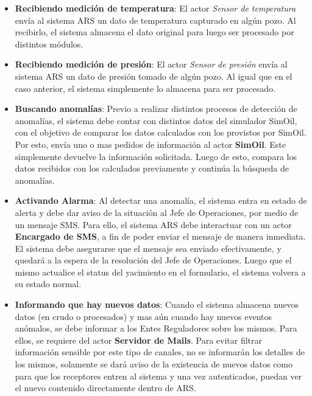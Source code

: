 \begin{itemize}
  \item \textbf{Recibiendo medición de temperatura}: El actor \textit{Sensor de temperatura} envía al sistema ARS un dato de temperatura capturado en algún pozo. Al recibirlo, el sistema almacena el dato original para luego ser procesado por distintos módulos.
  \item \textbf{Recibiendo medición de presión}: El actor \textit{Sensor de presión} envía al sistema ARS un dato de presión tomado de algún pozo. Al igual que en el caso anterior, el sistema simplemente lo almacena para ser procesado.
  \item \textbf{Buscando anomalías}: Previo a realizar distintos procesos de detección de anomalías, el sistema debe contar con distintos datos del simulador SimOil, con el objetivo de comparar los datos calculados con los provistos por SimOil. Por esto, envía uno o mas pedidos de información al actor \textbf{SimOil}. Este simplemente devuelve la información solicitada. Luego de esto, compara los datos recibidos con los calculados previamente y continúa la búsqueda de anomalías.
  \item \textbf{Activando Alarma}:
  Al detectar una anomalía, el sistema entra en estado de alerta y debe dar aviso de la situación al Jefe de Operaciones, por medio de un mensaje SMS. Para ello, el sistema ARS debe interactuar con un actor \textbf{Encargado de SMS}, a fin de poder enviar el mensaje de manera inmediata. El sistema debe asegurarse que el mensaje sea enviado efectivamente, y quedará a la espera de la resolución del Jefe de Operaciones. Luego que el mismo actualice el status del yacimiento en el formulario, el sistema volvera a su estado normal.
  \item \textbf{Informando que hay nuevos datos}:
  Cuando el sistema almacena nuevos datos (en crudo o procesados) y mas aún cuando hay nuevos eventos anómalos, se debe informar a los Entes Reguladores sobre los mismos. Para ellos, se requiere del actor \textbf{Servidor de Mails}. Para evitar filtrar información sensible por este tipo de canales, no se informarán los detalles de los mismos, solamente se dará aviso de la existencia de nuevos datos como para que los receptores entren al sistema y una vez autenticados, puedan ver el nuevo contenido directamente dentro de ARS.
\end{itemize}

